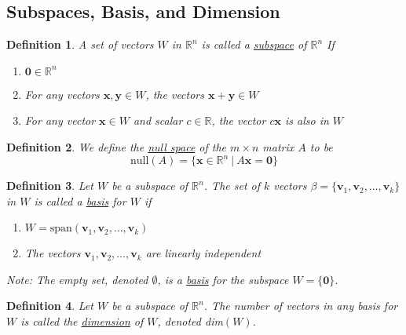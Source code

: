\documentclass{article}
\theoremstyle{definitionstyle}
\newtheorem{definition}{Definition}[section]
\begin{document}
\subsection{Subspaces, Basis, and Dimension}

\begin{definition}
    A set of vectors $W$ in $\mathbb{R}^n$ is called a \underline{subspace} of $\mathbb{R}^n$ If
    \begin{enumerate}
        \item $\mathbf{0}\in\mathbb{R}^n$
        \item For any vectors $\mathbf{x},\mathbf{y}\in W$, the vectors $\mathbf{x}+\mathbf{y} \in W$
        \item For any vector $\mathbf{x}\in W$ and scalar $c \in \mathbb{R}$, the vector $c\mathbf{x}$ is also in $W$
    \end{enumerate}
\end{definition}

\begin{definition}
    We define the \underline{null space} of the $m \times n$ matrix $A$ to be
    \begin{equation*}
        \mathrm{null}(A)=\{\mathbf{x} \in \mathbb{R}^n \ |\ A\mathbf{x}=\mathbf{0}\}
    \end{equation*}
\end{definition}

\begin{definition}
    Let $W$ be a subspace of $\mathbb{R}^n$. The set of $k$ vectors \newline 
    $\beta=\{\mathbf{v}_1,\mathbf{v}_2,\dots,\mathbf{v}_k\}$ in $W$ is called a \underline{basis} for $W$ if 
    \begin{enumerate}
        \item $W=\mathrm{span}(\mathbf{v}_1,\mathbf{v}_2,\dots,\mathbf{v}_k)$
        \item The vectors $\mathbf{v}_1,\mathbf{v}_2,\dots,\mathbf{v}_k$ are linearly independent
    \end{enumerate}
    \textit{Note:} The empty set, denoted $\emptyset$, is a \underline{basis} for the subspace $W=\{\mathbf{0}\}$.
\end{definition}

\begin{definition}
    Let $W$ be a subspace of $\mathbb{R}^n$. The number of vectors in any basis for $W$ is called the
    \underline{dimension} of $W$, denoted dim$(W)$.
\end{definition}
\end{document}
